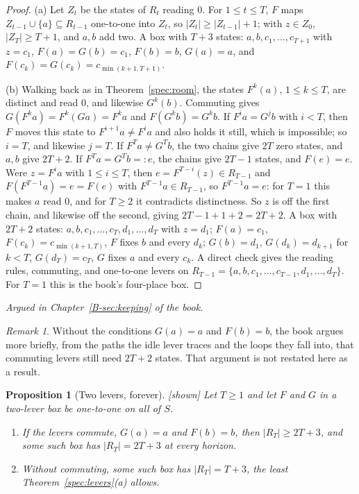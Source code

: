 \documentclass[11pt, a4paper]{article}
\theoremstyle{plain}
\newtheorem{proposition}[theorem]{Proposition}
\theoremstyle{definition}
\theoremstyle{remark}
\newtheorem{remark}[theorem]{Remark}
\newcommand{\argued}[1]{\par\noindent\textit{Argued in Chapter~\ref{B-#1} of the book.}\par}
\newcommand{\kind}[1]{\textup{[#1]}}
\begin{document}
\begin{proof}
(a) Let $Z_t$ be the states of $R_t$ reading $0$. For $1\le t\le T$, $F$ maps $Z_{t-1}\cup\{a\}\subseteq R_{t-1}$
one-to-one into $Z_t$, so $|Z_t|\ge|Z_{t-1}|+1$; with $z\in Z_0$, $|Z_T|\ge T+1$, and $a,b$ add two. A box with
$T+3$ states: $a,b,c_1,\dots,c_{T+1}$ with $z=c_1$, $F(a)=G(b)=c_1$, $F(b)=b$, $G(a)=a$, and
$F(c_k)=G(c_k)=c_{\min(k+1,T+1)}$.

(b) Walking back as in Theorem~\ref{spec:room}, the states $F^k(a)$, $1\le k\le T$, are distinct and read $0$,
and likewise $G^k(b)$. Commuting gives $G(F^k a)=F^k(Ga)=F^k a$ and $F(G^kb)=G^kb$. If $F^ia=G^jb$ with $i<T$,
then $F$ moves this state to $F^{i+1}a\ne F^ia$ and also holds it still, which is impossible; so $i=T$, and
likewise $j=T$. If $F^Ta\ne G^Tb$, the two chains give $2T$ zero states, and $a,b$ give $2T+2$. If
$F^Ta=G^Tb=:e$, the chains give $2T-1$ states, and $F(e)=e$. Were $z=F^ia$ with $1\le i\le T$, then
$e=F^{T-i}(z)\in R_{T-1}$ and $F(F^{T-1}a)=e=F(e)$ with $F^{T-1}a\in R_{T-1}$, so $F^{T-1}a=e$: for $T=1$ this
makes $a$ read $0$, and for $T\ge2$ it contradicts distinctness. So $z$ is off the first chain, and likewise off
the second, giving $2T-1+1+2=2T+2$. A box with $2T+2$ states: $a,b,c_1,\dots,c_T,d_1,\dots,d_T$ with $z=d_1$;
$F(a)=c_1$, $F(c_k)=c_{\min(k+1,T)}$, $F$ fixes $b$ and every $d_k$; $G(b)=d_1$, $G(d_k)=d_{k+1}$ for $k<T$,
$G(d_T)=c_T$, $G$ fixes $a$ and every $c_k$. A direct check gives the reading rules, commuting, and
one-to-one levers on $R_{T-1}=\{a,b,c_1,\dots,c_{T-1},d_1,\dots,d_T\}$. For $T=1$ this is the book's
four-place box.
\end{proof}

\argued{sec:keeping}

\begin{remark}\label{spec:levers-general}
Without the conditions $G(a)=a$ and $F(b)=b$, the book argues more briefly, from the paths the idle lever
traces and the loops they fall into, that commuting levers still need $2T+2$ states. That argument is not
restated here as a result.
\end{remark}

\begin{proposition}[Two levers, forever]\label{spec:levers-forever} \kind{shown}
Let $T\ge1$ and let $F$ and $G$ in a two-lever box be one-to-one on all of $S$.
\begin{enumerate}[label=(\alph*)]
\item If the levers commute, $G(a)=a$ and $F(b)=b$, then $|R_T|\ge2T+3$, and some such box has
$|R_T|=2T+3$ at every horizon.
\item Without commuting, some such box has $|R_T|=T+3$, the least Theorem~\ref{spec:levers}(a) allows.
\end{enumerate}
\end{proposition}
\end{document}

